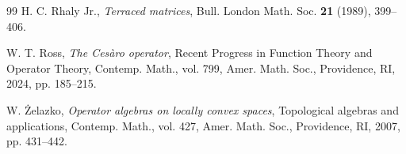 \documentclass{birkjour}
\theoremstyle{definition}
\theoremstyle{remark}
\numberwithin{equation}{section}
\begin{document}
\begin{thebibliography}{99}
 H. C. Rhaly Jr., \textit{Terraced matrices}, Bull. London Math. Soc. \textbf{21} (1989), 399--406.

 W. T. Ross, \textit{The Ces\`{a}ro operator}, Recent Progress in Function Theory and Operator Theory, Contemp. Math., vol. 799, Amer. Math. Soc., Providence, RI, 2024, pp. 185--215.

 W. \.{Z}elazko, \textit{Operator algebras on locally convex spaces}, Topological algebras and applications, Contemp. Math., vol. 427, Amer. Math. Soc., Providence, RI, 2007, pp. 431--442.

\end{thebibliography}





\end{document}
